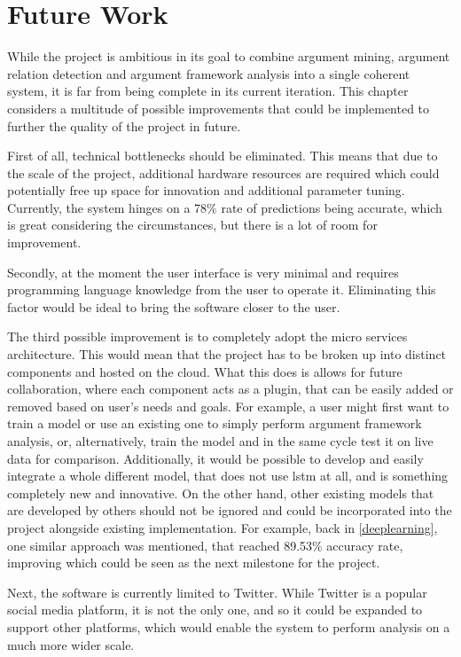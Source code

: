 \section{Future Work} \label{futurework}
    While the project is ambitious in its goal to combine argument mining, argument relation detection and argument framework analysis into a single coherent system, it is far from being complete in its current iteration. This chapter considers a multitude of possible improvements that could be implemented to further the quality of the project in future.
    
    First of all, technical bottlenecks should be eliminated. This means that due to the scale of the project, additional hardware resources are required which could potentially free up space for innovation and additional parameter tuning. Currently, the system hinges on a 78\% rate of predictions being accurate, which is great considering the circumstances, but there is a lot of room for improvement.
    
    Secondly, at the moment the user interface is very minimal and requires programming language knowledge from the user to operate it. Eliminating this factor would be ideal to bring the software closer to the user.
    
    The third possible improvement is to completely adopt the micro services architecture. This would mean that the project has to be broken up into distinct components and hosted on the cloud. What this does is allows for future collaboration, where each component acts as a plugin, that can be easily added or removed based on user's needs and goals. For example, a user might first want to train a model or use an existing one to simply perform argument framework analysis, or, alternatively, train the model and in the same cycle test it on live data for comparison. Additionally, it would be possible to develop and easily integrate a whole different model, that does not use \gls{lstm} at all, and is something completely new and innovative. On the other hand, other existing models that are developed by others should not be ignored and could be incorporated into the project alongside existing implementation. For example, back in \cref{deeplearning}, one similar approach was mentioned, that reached 89.53\% accuracy rate, improving which could be seen as the next milestone for the project.
    
    Next, the software is currently limited to Twitter. While Twitter is a popular social media platform, it is not the only one, and so it could be expanded to support other platforms, which would enable the system to perform analysis on a much more wider scale.
    
